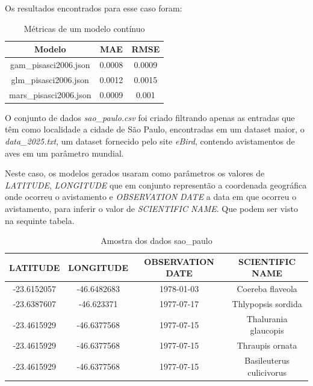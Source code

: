 \documentclass[
    12pt,               %
    openright,          %
    oneside,            %
    a4paper,            %
    english,            %
    brazil              %
    ]{abntex2}
\begin{document}
Os resultados encontrados para esse caso foram:

\begin{table}[H]
    \centering
    \caption{\label{tab:resultados_continuos} Métricas de um modelo contínuo}
    \begin{tabular}{|c|c|c|}
        \hline
        \textbf{Modelo} & \textbf{MAE} & \textbf{RMSE} \\ \hline
        gam\_pisasci2006.json & 0.0008 & 0.0009 \\ \hline
        glm\_pisasci2006.json & 0.0012 & 0.0015 \\ \hline
        mars\_pisasci2006.json & 0.0009 & 0.001 \\ \hline
    \end{tabular}
\end{table}

O conjunto de dados \textit{sao\_paulo.csv} foi criado filtrando apenas as entradas que têm como 
localidade a cidade de São Paulo, encontradas em um dataset maior, o \textit{data\_2025.txt}, um dataset
fornecido pelo site \textit{eBird}, contendo avistamentos de aves em um parâmetro mundial.

Neste caso, os modelos gerados usaram como parâmetros os valores de \textit{LATITUDE}, \textit{LONGITUDE}
que em conjunto representão a coordenada geográfica onde ocorreu o avistamento e \textit{OBSERVATION DATE}
a data em que ocorreu o avistamento, para inferir o valor de \textit{SCIENTIFIC NAME}. Que podem ser 
visto na sequinte tabela.

\begin{table}[H]
    \centering
    \caption{\label{tab:sao_paulo} Amostra dos dados sao\_paulo}
    \begin{tabular}{|c|c|c|c|}
        \hline
        \textbf{LATITUDE} & \textbf{LONGITUDE} & \textbf{OBSERVATION DATE} & \textbf{SCIENTIFIC NAME} \\ \hline
        -23.6152057 & -46.6482683 & 1978-01-03 & Coereba flaveola \\ \hline
        -23.6387607 & -46.623371 & 1977-07-17 & Thlypopsis sordida \\ \hline
        -23.4615929 & -46.6377568 & 1977-07-15 & Thalurania glaucopis \\ \hline
        -23.4615929 & -46.6377568 & 1977-07-15 & Thraupis ornata \\ \hline
        -23.4615929 & -46.6377568 & 1977-07-15 & Basileuterus culicivorus \\ \hline
    \end{tabular}
\end{table}
\end{document}
